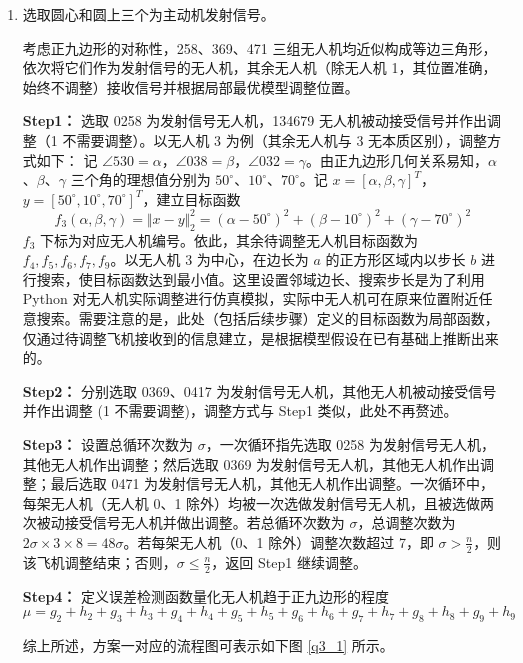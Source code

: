 \documentclass[withoutpreface,bwprint]{cumcmthesis} %
\begin{document}
\begin{enumerate}
    \item 选取圆心和圆上三个为主动机发射信号。

考虑正九边形的对称性，258、369、471 三组无人机均近似构成等边三角形，依次将它们作为发射信号的无人机，其余无人机（除无人机 1，其位置准确，始终不调整）接收信号并根据局部最优模型调整位置。

\textbf{Step1：} 选取 0258 为发射信号无人机，134679 无人机被动接受信号并作出调整（1 不需要调整）。以无人机 3 为例（其余无人机与 3 无本质区别），调整方式如下：
记 $\angle 530 = \alpha$，$\angle 038 = \beta$，$\angle 032 = \gamma$。由正九边形几何关系易知，$\alpha$、$\beta$、$\gamma$ 三个角的理想值分别为 $50^\circ$、$10^\circ$、$70^\circ$。记 $x = [\alpha, \beta, \gamma]^T$，$y = [50^\circ, 10^\circ, 70^\circ]^T$，建立目标函数
\[
f_3(\alpha, \beta, \gamma) = \Vert{x} - {y}\Vert_2^2 = (\alpha - 50^\circ)^2 + (\beta - 10^\circ)^2 + (\gamma - 70^\circ)^2
\]
$f_3$ 下标为对应无人机编号。依此，其余待调整无人机目标函数为 $f_4, f_5, f_6, f_7, f_9$。以无人机 3 为中心，在边长为 $a$ 的正方形区域内以步长 $b$ 进行搜索，使目标函数达到最小值。这里设置邻域边长、搜索步长是为了利用 Python 对无人机实际调整进行仿真模拟，实际中无人机可在原来位置附近任意搜索。需要注意的是，此处（包括后续步骤）定义的目标函数为局部函数，仅通过待调整飞机接收到的信息建立，是根据模型假设在已有基础上推断出来的。

\textbf{Step2：} 分别选取 0369、0417 为发射信号无人机，其他无人机被动接受信号并作出调整 (1 不需要调整)，调整方式与 Step1 类似，此处不再赘述。

\textbf{Step3：} 设置总循环次数为 $\sigma$，一次循环指先选取 0258 为发射信号无人机，其他无人机作出调整；然后选取 0369 为发射信号无人机，其他无人机作出调整；最后选取 0471 为发射信号无人机，其他无人机作出调整。一次循环中，每架无人机（无人机 0、1 除外）均被一次选做发射信号无人机，且被选做两次被动接受信号无人机并做出调整。若总循环次数为 $\sigma$，总调整次数为 $2\sigma \times 3 \times 8 = 48\sigma$。若每架无人机（0、1 除外）调整次数超过 7，即 $\sigma > \frac{n}{2}$，则该飞机调整结束；否则，$\sigma \leq \frac{n}{2}$，返回 Step1 继续调整。

\textbf{Step4：} 定义误差检测函数量化无人机趋于正九边形的程度
\[
\mu = g_2 + h_2 + g_3 + h_3 + g_4 + h_4 + g_5 + h_5 + g_6 + h_6 + g_7 + h_7 + g_8 + h_8 + g_9 + h_9
\]

综上所述，方案一对应的流程图可表示如下图 \ref{q3_1} 所示。


\end{enumerate}
\end{document}
